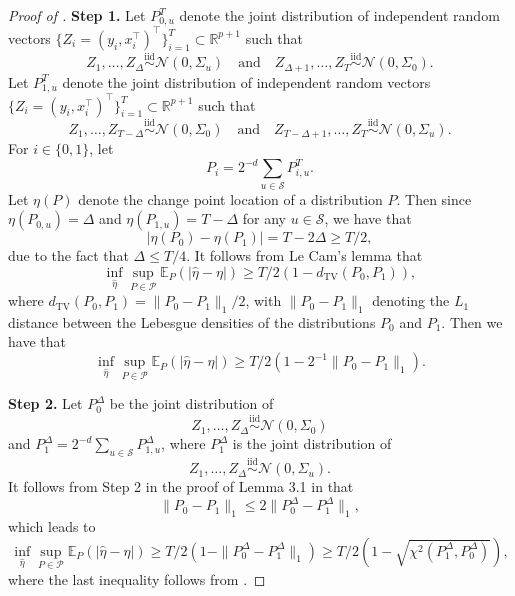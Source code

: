 \documentclass[twoside]{article}
\begin{document}
\begin{proof}[Proof of ]
\medskip
\noindent \textbf{Step 1.}  Let $P_{0, u}^T$ denote the joint distribution of independent random vectors $\{Z_i = (y_i, x_i^{\top})^{\top}\}_{i = 1}^T \subset \mathbb{R}^{p+1}$ such that
	\[
		Z_1, \ldots, Z_{\Delta} \stackrel{\mbox{iid}}{\sim} \mathcal{N}(0, \Sigma_u) \quad \mbox{and} \quad Z_{\Delta + 1}, \ldots, Z_T \stackrel{\mbox{iid}}{\sim} \mathcal{N}(0, \Sigma_0).
	\] 
	Let $P_{1, u}^T$ denote the joint distribution of independent random vectors $\{Z_i = (y_i, x_i^{\top})^{\top}\}_{i = 1}^T \subset \mathbb{R}^{p+1}$ such that
	\[
		Z_1, \ldots, Z_{T-\Delta} \stackrel{\mbox{iid}}{\sim} \mathcal{N}(0, \Sigma_0) \quad \mbox{and} \quad Z_{T-\Delta + 1}, \ldots, Z_T \stackrel{\mbox{iid}}{\sim} \mathcal{N}(0, \Sigma_u).
	\] 
	For $i \in \{0, 1\}$, let
	\[
		P_i = 2^{-d} \sum_{u \in \mathcal{S}} P_{i, u}^T.
	\]	
	Let $\eta(P)$ denote the change point location of a distribution $P$.  Then since $\eta(P_{0, u}) = \Delta$ and $\eta(P_{1, u}) = T-\Delta$ for any $u \in \mathcal{S}$, we have that
	\[
		|\eta(P_0) - \eta(P_1)| = T - 2\Delta \geq T/2,
	\]
	due to the fact that $\Delta \leq T/4$.  It follows from Le Cam's lemma \citep{yu1997assouad} that
	\[
		\inf_{\widehat{\eta}} \sup_{P \in \mathcal{P}} \mathbb{E}_P(|\widehat{\eta} - \eta|) \geq T/2 (1 - d_{\mathrm{TV}}(P_0, P_1)),
	\]
	where $d_{\mbox{TV}}(P_0, P_1) = \|P_0 - P_1\|_1/2$, with $\|P_0 - P_1\|_1$ denoting the $L_1$ distance between the Lebesgue densities of the distributions $P_0$ and $P_1$.  Then we have that
	\[
		\inf_{\widehat{\eta}} \sup_{P \in \mathcal{P}} \mathbb{E}_P(|\widehat{\eta} - \eta|) \geq T/2 (1 - 2^{-1}\|P_0 - P_1\|_1).
	\]

\medskip
\noindent \textbf{Step 2.}  Let $P_0^{\Delta}$ be the joint distribution of 
	\[
		Z_1, \ldots, Z_{\Delta} \stackrel{\mbox{iid}}{\sim} \mathcal{N}(0, \Sigma_0)
	\]	
	and $P_1^{\Delta} = 2^{-d} \sum_{u \in \mathcal{S}} P_{1, u}^{\Delta}$, where $P^{\Delta}_1$ is the joint distribution of 
	\[
		Z_1, \ldots, Z_{\Delta} \stackrel{\mbox{iid}}{\sim} \mathcal{N}(0, \Sigma_u).  
	\]
	It follows from Step 2 in the proof of Lemma 3.1 in \cite{wang2017optimal} that 
	\[
		\|P_0 - P_1\|_1 \leq 2 \|P_0^{\Delta} - P_1^{\Delta}\|_1,
	\]
	which leads to 
	\[
		\inf_{\widehat{\eta}} \sup_{P \in \mathcal{P}} \mathbb{E}_P(|\widehat{\eta} - \eta|) \geq T/2 (1 - \|P_0^{\Delta} - P_1^{\Delta}\|_1) \geq T/2 (1 - \sqrt{\chi^2(P_1^{\Delta}, P_0^{\Delta})}),
	\]
	where the last inequality follows from \cite{tsybakov2009introduction}.
	

\end{proof}
\end{document}
